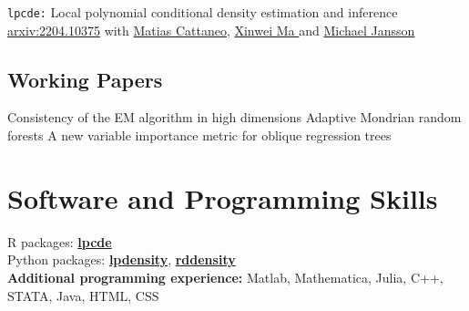 \documentclass[10pt,a4paper,roman]{moderncv}        %
\begin{document}
\cventry{}
{\vspace{-0.4cm}}
{\texttt{lpcde:} Local polynomial conditional density estimation and inference}
{\color{blue}\href{https://arxiv.org/abs/2204.10375}{arxiv:2204.10375}\color{black}}{}
{with \color{blue}\href{https://cattaneo.princeton.edu}{Matias Cattaneo}\color{black},
  \color{blue}\href{https://sites.google.com/view/xinweima/home?authuser=0}{Xinwei
    Ma }\color{black}
  and
  \color{blue}\href{https://sites.google.com/berkeley.edu/michael-jansson/}{Michael
    Jansson}\color{black}
  }
\subsection{Working Papers}
{Consistency of the EM algorithm in high dimensions} {}{}{}
{Adaptive Mondrian random forests} {}{}{}
{A new variable importance metric for oblique regression trees} {}{}{}

\vspace{-0.3cm}
\section{Software and Programming Skills}
R packages:
\color{blue}\href{https://nppackages.github.io/lpcde/}{\textbf{lpcde}}\color{black}
\\
Python packages: \color{blue}\href{https://nppackages.github.io/lpdensity_doc/}
{\textbf{lpdensity}}\color{black},
\color{blue}\href{https://rdpackages.github.io/rddensity_doc/}
{\textbf{rddensity}}\color{black}
\\
\textbf{Additional programming experience:}
Matlab, Mathematica, Julia, C++, STATA, Java, HTML, CSS

\end{document}
